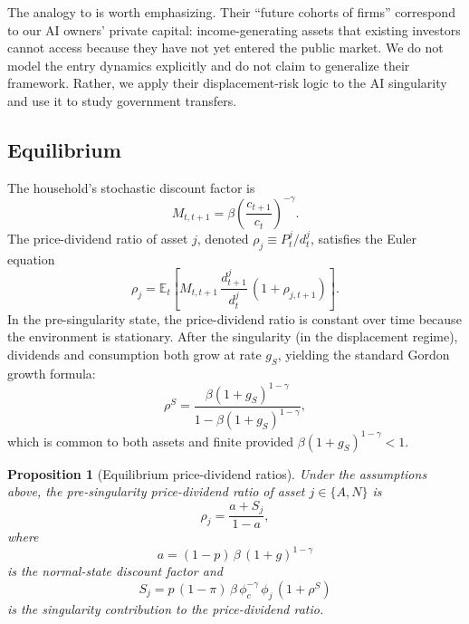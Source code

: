 \documentclass[12pt]{article}
\newtheorem{proposition}{Proposition}
\begin{document}
The analogy to \citet{GKP2012} is worth emphasizing.
Their ``future cohorts of firms'' correspond to our AI owners' private capital: income-generating assets that existing investors cannot access because they have not yet entered the public market.
We do not model the entry dynamics explicitly and do not claim to generalize their framework.
Rather, we apply their displacement-risk logic to the AI singularity and use it to study government transfers.

\subsection{Equilibrium}

The household's stochastic discount factor is
\begin{equation}
M_{t,t+1} = \beta \left(\frac{c_{t+1}}{c_t}\right)^{-\gamma}.
\label{eq:sdf} %
\end{equation}
The price-dividend ratio of asset $j$, denoted $\rho_j \equiv P_t^j / d_t^j$, satisfies the Euler equation
\begin{equation}
\rho_j = \mathbb{E}_t\!\left[M_{t,t+1}\,\frac{d_{t+1}^j}{d_t^j}\,(1 + \rho_{j,t+1})\right].
\label{eq:euler} %
\end{equation}
In the pre-singularity state, the price-dividend ratio is constant over time because the environment is stationary.
After the singularity (in the displacement regime), dividends and consumption both grow at rate $g_S$, yielding the standard Gordon growth formula:
\begin{equation}
\rho^S = \frac{\beta(1+g_S)^{1-\gamma}}{1 - \beta(1+g_S)^{1-\gamma}},
\label{eq:pd_post} %
\end{equation}
which is common to both assets and finite provided $\beta(1+g_S)^{1-\gamma} < 1$.

\begin{proposition}[Equilibrium price-dividend ratios] \label{prop:pd} %
Under the assumptions above, the pre-singularity price-dividend ratio of asset $j \in \{A, N\}$ is
\begin{equation}
\rho_j = \frac{a + S_j}{1 - a},
\label{eq:pd_pre} %
\end{equation}
where
\begin{equation}
a = (1-p)\,\beta\,(1+g)^{1-\gamma}
\label{eq:a} %
\end{equation}
is the normal-state discount factor and
\begin{equation}
S_j = p\,(1-\pi)\,\beta\,\phi_c^{-\gamma}\,\phi_j\,(1 + \rho^S)
\label{eq:Sj} %
\end{equation}
is the singularity contribution to the price-dividend ratio.
\end{proposition}
\end{document}
